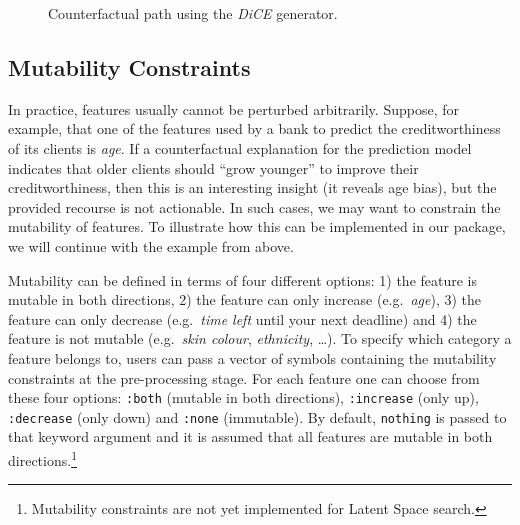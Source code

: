 \documentclass{juliacon}
\begin{document}
\begin{figure}


\caption{\label{fig-binary-advanced}Counterfactual path using the
\emph{DiCE} generator.}

\end{figure}%

\subsection{Mutability Constraints}\label{sec-mut}

In practice, features usually cannot be perturbed arbitrarily. Suppose,
for example, that one of the features used by a bank to predict the
creditworthiness of its clients is \emph{age}. If a counterfactual
explanation for the prediction model indicates that older clients should
``grow younger'' to improve their creditworthiness, then this is an
interesting insight (it reveals age bias), but the provided recourse is
not actionable. In such cases, we may want to constrain the mutability
of features. To illustrate how this can be implemented in our package,
we will continue with the example from above.

Mutability can be defined in terms of four different options: 1) the
feature is mutable in both directions, 2) the feature can only increase
(e.g.~\emph{age}), 3) the feature can only decrease (e.g.~\emph{time
left} until your next deadline) and 4) the feature is not mutable
(e.g.~\emph{skin colour}, \emph{ethnicity}, \ldots). To specify which
category a feature belongs to, users can pass a vector of symbols
containing the mutability constraints at the pre-processing stage. For
each feature one can choose from these four options: \texttt{:both}
(mutable in both directions), \texttt{:increase} (only up),
\texttt{:decrease} (only down) and \texttt{:none} (immutable). By
default, \texttt{nothing} is passed to that keyword argument and it is
assumed that all features are mutable in both directions.\footnote{Mutability
  constraints are not yet implemented for Latent Space search.}
\end{document}
